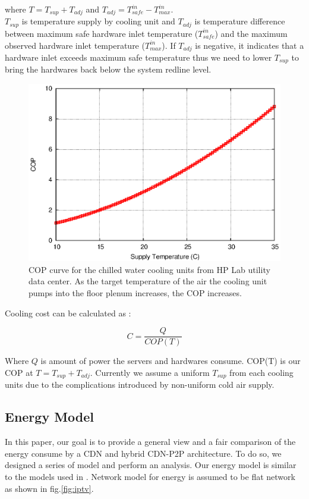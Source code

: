 \documentclass[JIP]{ipsj}
\begin{document}
where $T = T_{sup} + T_{adj}$ and $T_{adj} = T_{safe}^{in}-T_{max}^{in}$. \\
$T_{sup}$ is temperature supply by cooling unit and $T_{adj}$ is temperature difference between maximum safe hardware inlet temperature ($T_{safe}^{in}$) and the maximum observed hardware inlet temperature ($T_{max}^{in}$).
If $T_{adj}$ is negative, it indicates that a hardware inlet exceeds maximum safe temperature thus we need to lower $T_{sup}$ to bring the hardwares back below the system redline level.

\begin{figure}[thb]
\begin{center}
\includegraphics[scale=0.5]{graphs/cop.eps}
\end{center}
\caption{COP curve for the chilled water cooling units from HP Lab utility data center.
As the target temperature of the air the cooling unit pumps into the floor plenum increases, the COP increases.}
\label{fig:twotier}
\vspace{-2mm}
\end{figure} 

Cooling cost can be calculated as  \cite{moore2005making} :

\begin{equation}\label{eqn:cost}
C = \frac{Q}{COP(T)}
\end{equation}

Where $Q$ is amount of power the servers and hardwares consume.
COP(T) is our COP at $T=T_{sup}+T_{adj}$.
Currently we assume a uniform $T_{sup}$ from each cooling units due to the complications introduced by non-uniform cold air supply.


\subsection{Energy Model}\label{energy model}
In this paper, our goal is to provide a general view and a fair comparison of the energy consume by a CDN and hybrid CDN-P2P architecture. 
To do so, we designed a series of model and perform an analysis.
Our energy model is similar to the models used in \cite{Nedevschi:2008:HDC:1855610.1855618}.
Network model for energy is assumed to be flat network as shown in fig.\ref{fig:iptv}.
\end{document}
